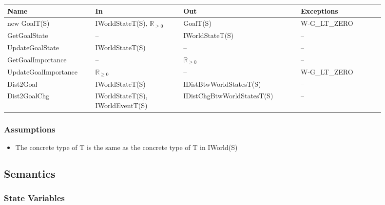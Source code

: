 \begin{center}
    \renewcommand{\arraystretch}{1.2}
    \begin{tabular}{m{0.21\linewidth} m{0.21\linewidth} m{0.28\linewidth}
            m{0.2\linewidth}}
        \toprule
        \textbf{Name} & \textbf{In} & \textbf{Out} & \textbf{Exceptions} \\
        \midrule

        \rowcolor[gray]{0.9}new GoalT(S) & IWorldStateT(S), $\mathbb{R}_{\geq
        0}$ & GoalT(S) & W-G\_LT\_ZERO \\

        GetGoalState & -- & IWorldStateT(S) & -- \\

        \rowcolor[gray]{0.9}UpdateGoalState & IWorldStateT(S) & -- & -- \\

        GetGoalImportance & -- & $\mathbb{R}_{\geq 0}$ & -- \\

        \rowcolor[gray]{0.9}UpdateGoalImportance & $\mathbb{R}_{\geq 0}$ & -- &
        W-G\_LT\_ZERO \\

        Dist2Goal & IWorldStateT(S) & IDistBtwWorldStatesT(S) & -- \\

        \rowcolor[gray]{0.9}Dist2GoalChg & IWorldStateT(S), IWorldEventT(S) &
        IDistChgBtwWorldStatesT(S) & -- \\

        \bottomrule
    \end{tabular}
\end{center}

\subsubsection{Assumptions}
\begin{itemize}
    \item The concrete type of T is the same as the concrete type of T in
    IWorld(S)
\end{itemize}

\subsection{Semantics}

\subsubsection{State Variables}

